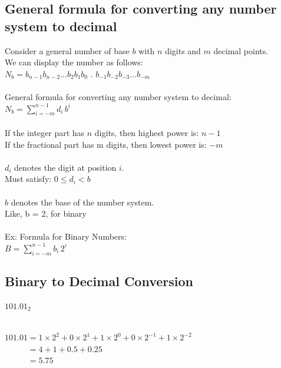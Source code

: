 \documentclass{article}
\begin{document}
\subsection*{General formula for converting any number system to decimal}
Consider a general number of base $b$ with $n$ digits and $m$ decimal points.\\
We can display the number as follows:\\
$N_b = b_{n-1}b_{n-2}...b_2b_1b_0$  .  $b_{-1}b_{-2}b_{-3}...b_{-m}$\\
\\
General formula for converting any number system to decimal:\\
$N_{b} = \sum_{i=-m}^{n-1} d_i \, b^i$\\
\\
If the integer part has $n$ digits, then highest power is: $n-1$\\
If the fractional part has m digits, then lowest power is: $-m$\\
\\
$d_i$ denotes the digit at position $i$.\\
Must satisfy: $0 \le d_i < b$\\
\\
$b$ denotes the base of the number system.\\
Like, b = 2, for binary\\
\\
Ex: Formula for Binary Numbers:\\
$B = \sum_{i=-m}^{n-1} b_i \, 2^i$\\

\subsection*{Binary to Decimal Conversion}
$101.01_2$\\

\\
$101.01= 1 \times 2^2 + 0 \times 2^1 + 1 \times 2^0 + 0 \times 2^{-1} + 1 \times 2^{-2}$\\
$\phantom{00000.} =4 + 1 + 0.5 + 0.25$\\
$\phantom{00000.} = 5.75$
\end{document}

